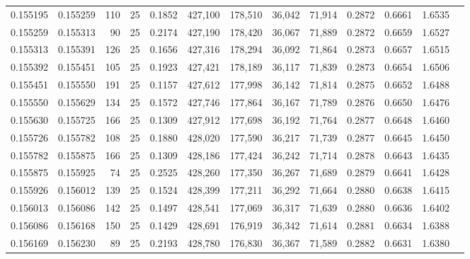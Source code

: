 \begin{tabular}{rrrrrrrrrrrrr}
0.155195 & 0.155259 &   110 &  25 &                                     0.1852 & 427,100 & 178,510 &  36,042 &  71,914 & 0.2872 & 0.6661 & 1.6535 \\
0.155259 & 0.155313 &    90 &  25 &                                     0.2174 & 427,190 & 178,420 &  36,067 &  71,889 & 0.2872 & 0.6659 & 1.6527 \\
0.155313 & 0.155391 &   126 &  25 &                                     0.1656 & 427,316 & 178,294 &  36,092 &  71,864 & 0.2873 & 0.6657 & 1.6515 \\
0.155392 & 0.155451 &   105 &  25 &                                     0.1923 & 427,421 & 178,189 &  36,117 &  71,839 & 0.2873 & 0.6654 & 1.6506 \\
0.155451 & 0.155550 &   191 &  25 &                                     0.1157 & 427,612 & 177,998 &  36,142 &  71,814 & 0.2875 & 0.6652 & 1.6488 \\
0.155550 & 0.155629 &   134 &  25 &                                     0.1572 & 427,746 & 177,864 &  36,167 &  71,789 & 0.2876 & 0.6650 & 1.6476 \\
0.155630 & 0.155725 &   166 &  25 &                                     0.1309 & 427,912 & 177,698 &  36,192 &  71,764 & 0.2877 & 0.6648 & 1.6460 \\
0.155726 & 0.155782 &   108 &  25 &                                     0.1880 & 428,020 & 177,590 &  36,217 &  71,739 & 0.2877 & 0.6645 & 1.6450 \\
0.155782 & 0.155875 &   166 &  25 &                                     0.1309 & 428,186 & 177,424 &  36,242 &  71,714 & 0.2878 & 0.6643 & 1.6435 \\
0.155875 & 0.155925 &    74 &  25 &                                     0.2525 & 428,260 & 177,350 &  36,267 &  71,689 & 0.2879 & 0.6641 & 1.6428 \\
0.155926 & 0.156012 &   139 &  25 &                                     0.1524 & 428,399 & 177,211 &  36,292 &  71,664 & 0.2880 & 0.6638 & 1.6415 \\
0.156013 & 0.156086 &   142 &  25 &                                     0.1497 & 428,541 & 177,069 &  36,317 &  71,639 & 0.2880 & 0.6636 & 1.6402 \\
0.156086 & 0.156168 &   150 &  25 &                                     0.1429 & 428,691 & 176,919 &  36,342 &  71,614 & 0.2881 & 0.6634 & 1.6388 \\
0.156169 & 0.156230 &    89 &  25 &                                     0.2193 & 428,780 & 176,830 &  36,367 &  71,589 & 0.2882 & 0.6631 & 1.6380 \\

\end{tabular}
